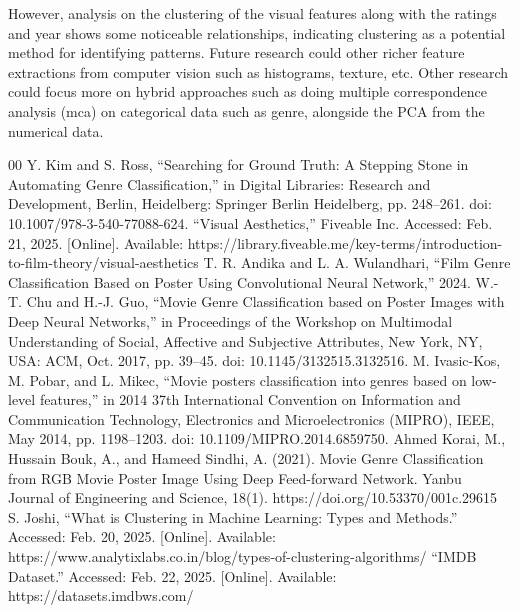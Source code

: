 \documentclass[conference]{IEEEtran}
\begin{document}
However, analysis on the clustering of the visual features along with the ratings and year shows some noticeable relationships, indicating clustering as a potential method for identifying patterns. Future research could other richer feature extractions from computer vision such as histograms, texture, etc. Other research could focus more on hybrid approaches such as doing multiple correspondence analysis (mca) on categorical data such as genre, alongside the PCA from the numerical data.

\begin{thebibliography}{00}
 Y. Kim and S. Ross, “Searching for Ground Truth: A Stepping Stone in Automating Genre Classification,” in Digital Libraries: Research and Development, Berlin, Heidelberg: Springer Berlin Heidelberg, pp. 248–261. doi: 10.1007/978-3-540-77088-624.
 “Visual Aesthetics,” Fiveable Inc. Accessed: Feb. 21, 2025. [Online]. Available: https://library.fiveable.me/key-terms/introduction-to-film-theory/visual-aesthetics  
 T. R. Andika and L. A. Wulandhari, “Film Genre Classification Based on Poster Using Convolutional Neural Network,” 2024.
 W.-T. Chu and H.-J. Guo, “Movie Genre Classification based on Poster Images with Deep Neural Networks,” in Proceedings of the Workshop on Multimodal Understanding of Social, Affective and Subjective Attributes, New York, NY, USA: ACM, Oct. 2017, pp. 39–45. doi: 10.1145/3132515.3132516.
 M. Ivasic-Kos, M. Pobar, and L. Mikec, “Movie posters classification into genres based on low-level features,” in 2014 37th International Convention on Information and Communication Technology, Electronics and Microelectronics (MIPRO), IEEE, May 2014, pp. 1198–1203. doi: 10.1109/MIPRO.2014.6859750.  
 Ahmed Korai, M., Hussain Bouk, A., and Hameed Sindhi, A. (2021). Movie Genre Classification from RGB Movie Poster Image Using Deep Feed-forward Network. Yanbu Journal of Engineering and Science, 18(1). https://doi.org/10.53370/001c.29615
 S. Joshi, “What is Clustering in Machine Learning: Types and Methods.” Accessed: Feb. 20, 2025. [Online]. Available: https://www.analytixlabs.co.in/blog/types-of-clustering-algorithms/
 “IMDB Dataset.” Accessed: Feb. 22, 2025. [Online]. Available: https://datasets.imdbws.com/
  
  
\end{thebibliography}
\end{document}
